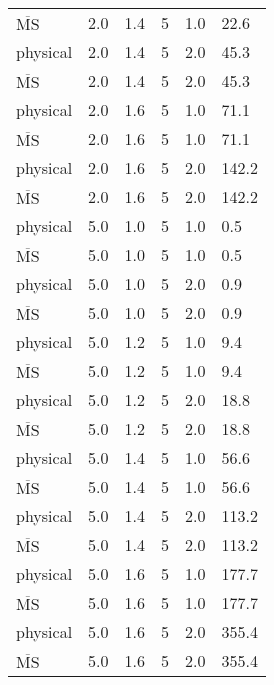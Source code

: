 \begin{table}[h]
\begin{tabular}{llllll}
$\overline{\mathrm{MS}}$ & 2.0 & 1.4 & 5 & 1.0 & 22.6\\
physical & 2.0 & 1.4 & 5 & 2.0 & 45.3\\
$\overline{\mathrm{MS}}$ & 2.0 & 1.4 & 5 & 2.0 & 45.3\\
physical & 2.0 & 1.6 & 5 & 1.0 & 71.1\\
$\overline{\mathrm{MS}}$ & 2.0 & 1.6 & 5 & 1.0 & 71.1\\
physical & 2.0 & 1.6 & 5 & 2.0 & 142.2\\
$\overline{\mathrm{MS}}$ & 2.0 & 1.6 & 5 & 2.0 & 142.2\\
physical & 5.0 & 1.0 & 5 & 1.0 & 0.5\\
$\overline{\mathrm{MS}}$ & 5.0 & 1.0 & 5 & 1.0 & 0.5\\
physical & 5.0 & 1.0 & 5 & 2.0 & 0.9\\
$\overline{\mathrm{MS}}$ & 5.0 & 1.0 & 5 & 2.0 & 0.9\\
physical & 5.0 & 1.2 & 5 & 1.0 & 9.4\\
$\overline{\mathrm{MS}}$ & 5.0 & 1.2 & 5 & 1.0 & 9.4\\
physical & 5.0 & 1.2 & 5 & 2.0 & 18.8\\
$\overline{\mathrm{MS}}$ & 5.0 & 1.2 & 5 & 2.0 & 18.8\\
physical & 5.0 & 1.4 & 5 & 1.0 & 56.6\\
$\overline{\mathrm{MS}}$ & 5.0 & 1.4 & 5 & 1.0 & 56.6\\
physical & 5.0 & 1.4 & 5 & 2.0 & 113.2\\
$\overline{\mathrm{MS}}$ & 5.0 & 1.4 & 5 & 2.0 & 113.2\\
physical & 5.0 & 1.6 & 5 & 1.0 & 177.7\\
$\overline{\mathrm{MS}}$ & 5.0 & 1.6 & 5 & 1.0 & 177.7\\
physical & 5.0 & 1.6 & 5 & 2.0 & 355.4\\
$\overline{\mathrm{MS}}$ & 5.0 & 1.6 & 5 & 2.0 & 355.4\\
\hline
\end{tabular}
\end{table}
